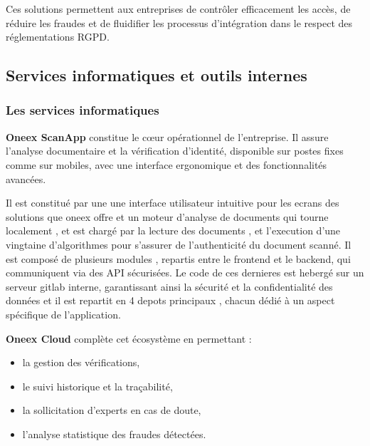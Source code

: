 Ces solutions permettent aux entreprises de contrôler efficacement les accès, de réduire les fraudes et de fluidifier les processus d’intégration dans le respect des réglementations RGPD.

\subsection{Services informatiques et outils internes}

\subsubsection{Les services informatiques}

\textbf{Oneex ScanApp} constitue le cœur opérationnel de l’entreprise. Il assure l’analyse documentaire et la vérification d’identité, disponible sur postes fixes comme sur mobiles, avec une interface ergonomique et des fonctionnalités avancées.

Il est constitué par une une interface utilisateur intuitive pour les ecrans des solutions que oneex offre et un moteur d’analyse de documents qui tourne localement , et est chargé par la lecture des documents , et l'execution d'une vingtaine d'algorithmes pour s'assurer de l'authenticité du document scanné.
Il est composé de plusieurs modules , repartis entre le frontend et le backend, qui communiquent via des API sécurisées.
Le code de ces dernieres est hebergé sur un serveur gitlab interne, garantissant ainsi la sécurité et la confidentialité des données et il est repartit en 4 depots principaux , chacun dédié à un aspect spécifique de l'application.

\textbf{Oneex Cloud} complète cet écosystème en permettant :

\begin{itemize}
	\item la gestion des vérifications,
	\item le suivi historique et la traçabilité,
	\item la sollicitation d’experts en cas de doute,
	\item l’analyse statistique des fraudes détectées.
\end{itemize}

